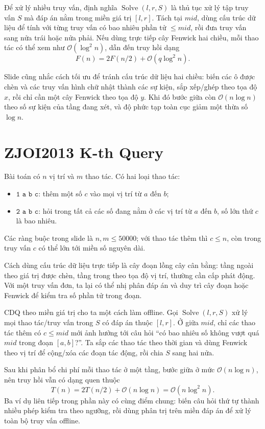 \documentclass[11pt]{article}
\newcommand{\Oh}{\mathcal{O}}
\newcommand{\Solve}{\operatorname{Solve}}
\begin{document}
Để xử lý nhiều truy vấn, định nghĩa \(\Solve(l,r,S)\) là thủ tục xử lý tập
truy vấn \(S\) mà đáp án nằm trong miền giá trị \([l,r]\). Tách tại
\(\mathit{mid}\), dùng cấu trúc dữ liệu để tính với từng truy vấn có bao
nhiêu phần tử \(\le\mathit{mid}\), rồi đưa truy vấn sang nửa trái hoặc nửa
phải. Nếu dùng trực tiếp cây Fenwick hai chiều, mỗi thao tác có thể xem như
\(\Oh(\log^2 n)\), dẫn đến truy hồi dạng
\[
  F(n)=2F(n/2)+\Oh(q\log^2 n).
\]

Slide cũng nhắc cách tối ưu để tránh cấu trúc dữ liệu hai chiều: biến các ô
được chèn và các truy vấn hình chữ nhật thành các sự kiện, sắp xếp/ghép theo
tọa độ \(x\), rồi chỉ cần một cây Fenwick theo tọa độ \(y\). Khi đó bước giữa
còn \(\Oh(n\log n)\) theo số sự kiện của tầng đang xét, và độ phức tạp toàn
cục giảm một thừa số \(\log n\).

\section{ZJOI2013 K-th Query}

Bài toán có \(n\) vị trí và \(m\) thao tác. Có hai loại thao tác:
\begin{itemize}
  \item \(\texttt{1 a b c}\): thêm một số \(c\) vào mọi vị trí từ \(a\) đến
  \(b\);
  \item \(\texttt{2 a b c}\): hỏi trong tất cả các số đang nằm ở các vị trí
  từ \(a\) đến \(b\), số lớn thứ \(c\) là bao nhiêu.
\end{itemize}
Các ràng buộc trong slide là \(n,m\le 50000\); với thao tác thêm thì
\(c\le n\), còn trong truy vấn \(c\) có thể lớn tới miền số nguyên dài.

Cách dùng cấu trúc dữ liệu trực tiếp là cây đoạn lồng cây cân bằng: tầng ngoài
theo giá trị được chèn, tầng trong theo tọa độ vị trí, thường cần cấp phát
động. Với một truy vấn đơn, ta lại có thể nhị phân đáp án và duy trì cây đoạn
hoặc Fenwick để kiểm tra số phần tử trong đoạn.

CDQ theo miền giá trị cho ta một cách làm offline. Gọi \(\Solve(l,r,S)\) xử
lý mọi thao tác/truy vấn trong \(S\) có đáp án thuộc \([l,r]\). Ở giữa
\(\mathit{mid}\), chỉ các thao tác thêm có \(c\le\mathit{mid}\) mới ảnh hưởng
tới câu hỏi ``có bao nhiêu số không vượt quá \(\mathit{mid}\) trong đoạn
\([a,b]\)?''. Ta sắp các thao tác theo thời gian và dùng Fenwick theo vị trí
để cộng/xóa các đoạn tác động, rồi chia \(S\) sang hai nửa.

Sau khi phân bổ chi phí mỗi thao tác ở một tầng, bước giữa ở mức
\(\Oh(n\log n)\), nên truy hồi vẫn có dạng quen thuộc
\[
  T(n)=2T(n/2)+\Oh(n\log n)=\Oh(n\log^2 n).
\]
Ba ví dụ liên tiếp trong phần này có cùng điểm chung: biến câu hỏi thứ tự
thành nhiều phép kiểm tra theo ngưỡng, rồi dùng phân trị trên miền đáp án để
xử lý toàn bộ truy vấn offline.
\end{document}
